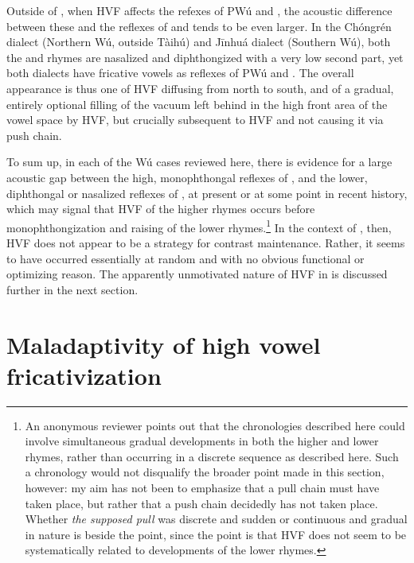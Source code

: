 \documentclass[output=paper,hidelinks]{langscibook}
\begin{document}
Outside of \THW{}, when HVF affects the refexes of PWú \pri{} and \pry{}, the acoustic difference between these and the reflexes of \prien{} and \pryen{} tends to be even larger. In the Chóngrén dialect (Northern Wú, outside Tàihú) and Jīnhuá dialect (Southern Wú), both the \prien{} and \pryen{} rhymes are nasalized and diphthongized with a very low second part, yet both dialects have fricative vowels as reflexes of PWú \pri{} and \pry{}. The overall appearance is thus one of HVF diffusing from north to south, and of a gradual, entirely optional filling of the vacuum left behind in the high front area of the vowel space by HVF, but crucially subsequent to HVF and not causing it via push chain.

To sum up, in each of the Wú cases reviewed here, there is evidence for a large acoustic gap between the high, monophthongal reflexes of \pri{}, \pry{} and the lower, diphthongal or nasalized reflexes of \prien{}, \pryen{} at present or at some point in recent history, which may signal that HVF of the higher rhymes occurs before monophthongization and raising of the lower rhymes.\footnote{An anonymous reviewer points out that the chronologies described here could involve simultaneous gradual developments in both the higher and lower rhymes, rather than occurring in a discrete sequence as described here. Such a chronology would not disqualify the broader point made in this section, however: my aim has not been to emphasize that a pull chain must have taken place, but rather that a push chain decidedly has not taken place. Whether \textit{the supposed pull} was discrete and sudden or continuous and gradual in nature is beside the point, since the point is that HVF does not seem to be systematically related to developments of the lower rhymes.}
%
In the context of \THW{}, then, HVF does not appear to be a strategy for contrast maintenance.
Rather, it seems to have occurred essentially at random and with no obvious functional or optimizing reason. The apparently unmotivated nature of HVF in \THW{} is discussed further in the next section.


\section{Maladaptivity of high vowel fricativization}\label{sec:faytak:4}
\end{document}
